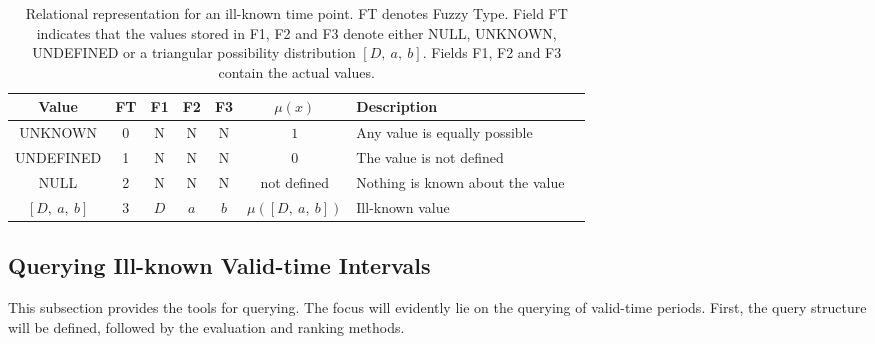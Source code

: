 \vspace{-10pt}

\begin{table}
\centering
\caption{Relational representation for an ill-known time point. FT denotes Fuzzy Type. Field FT indicates that the values stored in F1, F2 and F3 denote either NULL, UNKNOWN, UNDEFINED or a triangular possibility distribution $\left[D,\ a,\ b \right]$. Fields F1, F2 and F3 contain the actual values.}%
\begin{tabular}{c c c c c c l p{2cm}}
\hline
Value & FT & F1 & F2 & F3 & $\mu(x)$ & Description \\ \hline
UNKNOWN & 0 & N & N & N  & $1$ & Any value is equally possible\\ 
UNDEFINED & 1 & N & N & N & $0$ & The value is not defined \\%
NULL & 2 & N & N & N &not defined & Nothing is known about the value \\ 
$\left[D,\ a,\ b \right]$ & 3 & $D$ & $a$ & $b$ & $\mu(\left[D,\ a,\ b \right])$ & Ill-known value \\ 
\hline 
\end{tabular}
\label{table:relational-representation-pvp}

\vspace{10pt}


\end{table}

\vspace{-25pt}

\subsection{Querying Ill-known Valid-time Intervals}
This subsection provides the tools for querying. The focus will evidently lie on the querying of valid-time periods. First, the query structure will be defined, followed by the evaluation and ranking methods.




